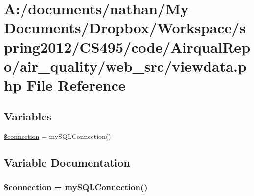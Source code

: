 \hypertarget{viewdata_8php}{\section{A\-:/documents/nathan/\-My Documents/\-Dropbox/\-Workspace/spring2012/\-C\-S495/code/\-Airqual\-Repo/air\-\_\-quality/web\-\_\-src/viewdata.php File Reference}
\label{viewdata_8php}
}
\subsection*{Variables}
\begin{DoxyCompactItemize}
\item 
\hyperlink{viewdata_8php_a0d9c79b9b86b3f5891c6d3892f12c6a0}{\$connection} = my\-S\-Q\-L\-Connection()
\end{DoxyCompactItemize}


\subsection{Variable Documentation}
\hypertarget{viewdata_8php_a0d9c79b9b86b3f5891c6d3892f12c6a0}{
\subsubsection[{\$connection}]{\setlength{\rightskip}{0pt plus 5cm}\$connection = my\-S\-Q\-L\-Connection()}}\label{viewdata_8php_a0d9c79b9b86b3f5891c6d3892f12c6a0}
